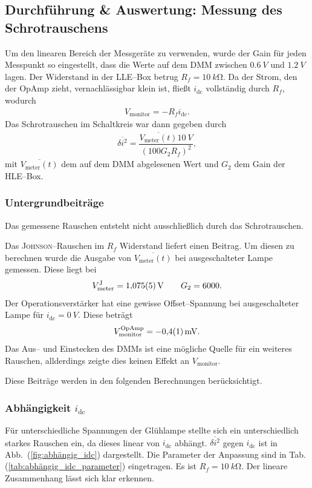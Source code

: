 \documentclass[sn-mathphys-num,iicol]{sn-jnl}
\theoremstyle{thmstyleone}
\theoremstyle{thmstyletwo}
\theoremstyle{thmstylethree}
\begin{document}
\subsection{Durchführung \& Auswertung: Messung des Schrotrauschens}
Um den linearen Bereich der Messgeräte zu verwenden, wurde der Gain für jeden Messpunkt so eingestellt, dass die Werte auf dem DMM zwischen $\SI{0.6}{V}$ und $\SI{1.2}{V}$ lagen.
Der Widerstand in der LLE--Box betrug $R_f=\SI{10}{k\ohm}$.
Da der Strom, den der OpAmp zieht, vernachlässigbar klein ist, fließt $i_\text{dc}$ vollständig durch $R_f$, wodurch
\begin{align} 
        V_\text{monitor}=-R_fi_\text{dc}
.\end{align} 
Das Schrotrauschen im Schaltkreis war dann gegeben durch
\begin{align} 
        \overline{\delta i^2}=\dfrac{\overline{V_\text{meter}(t)}\SI{10}{V}}{(100G_2R_f)^2}
,\end{align} 
mit $\overline{V_\text{meter}(t)}$ dem auf dem DMM abgelesenen Wert und $G_2$ dem Gain der HLE--Box.

\subsubsection{Untergrundbeiträge}
Das gemessene Rauschen entsteht nicht ausschließlich durch das Schrotrauschen.

Das \textsc{Johnson}--Rauschen im $R_f$ Widerstand liefert einen Beitrag.
Um diesen zu berechnen wurde die Ausgabe von $\overline{V_\text{meter}(t)}$ bei ausgeschalteter Lampe gemessen.
Diese liegt bei
\begin{align} 
        V_\text{meter}^\text{J}=\SI{1.075+-0.005}{V}\qquad G_2=6000
.\end{align} 
Der Operationsverstärker hat eine gewisse Offset--Spannung bei ausgeschalteter Lampe für $i_\text{dc}=\SI{0}{V}$.
Diese beträgt
\begin{align} 
        V_\text{monitor}^\text{OpAmp}=\SI{-0.4+-0.1}{mV}
.\end{align}
Das Aus-- und Einstecken des DMMs ist eine mögliche Quelle für ein weiteres Rauschen, allderdings zeigte dies keinen Effekt an $V_\text{monitor}$.

Diese Beiträge werden in den folgenden Berechnungen berücksichtigt.

\subsubsection{Abhängigkeit $i_\text{dc}$}
Für unterschiedliche Spannungen der Glühlampe stellte sich ein unterschiedlich starkes Rauschen ein, da dieses linear von $i_\text{dc}$ abhängt.
$\overline{\delta i^2}$ gegen $i_\text{dc}$ ist in Abb.\ (\ref{fig:abhängig_idc}) dargestellt.
Die Parameter der Anpassung sind in Tab. (\ref{tab:abhängig_idc_parameter}) eingetragen.
Es ist $R_f=\SI{10}{k\ohm}$.
Der lineare Zusammenhang lässt sich klar erkennen. %
\end{document}
